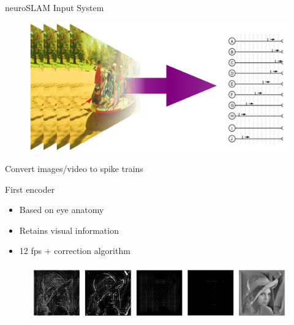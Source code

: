 \documentclass[17pt,mathserif]{beamer}
\begin{document}
    \begin{frame}{neuroSLAM Input System}
        \vspace*{-4em}
        \begin{figure}
            \includegraphics[scale=0.3]{./images-to-spikes}
        \end{figure}
        \vspace*{-0.4em}
        \hspace*{0.05\textwidth}
        \begin{minipage}{0.9\textwidth}
          \centering \small Convert images/video to spike trains
        \end{minipage}
    \end{frame}
    
    \begin{frame}{First encoder}
      \vspace*{-3em}
      \begin{itemize}
        \item Based on eye anatomy\cite{basab}
        \item Retains visual information
        \item 12 fps + correction algorithm
      \end{itemize}
      \vspace*{-1em}
      \begin{figure}
        \includegraphics[width=\textwidth]{focal-imgs}
      \end{figure}
    \end{frame}
\end{document}

